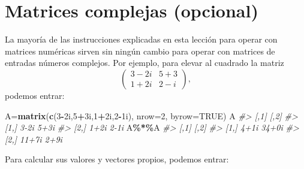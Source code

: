 \documentclass[
]{book}
\newenvironment{Shaded}{\begin{snugshade}}{\end{snugshade}}
\newcommand{\CommentTok}[1]{\textcolor[rgb]{0.56,0.35,0.01}{\textit{#1}}}
\newcommand{\DataTypeTok}[1]{\textcolor[rgb]{0.13,0.29,0.53}{#1}}
\newcommand{\DecValTok}[1]{\textcolor[rgb]{0.00,0.00,0.81}{#1}}
\newcommand{\KeywordTok}[1]{\textcolor[rgb]{0.13,0.29,0.53}{\textbf{#1}}}
\newcommand{\NormalTok}[1]{#1}
\newcommand{\OperatorTok}[1]{\textcolor[rgb]{0.81,0.36,0.00}{\textbf{#1}}}
\newcommand{\OtherTok}[1]{\textcolor[rgb]{0.56,0.35,0.01}{#1}}
\theoremstyle{definition}
\theoremstyle{definition}
\theoremstyle{definition}
\theoremstyle{remark}
\begin{document}
\hypertarget{matrices-complejas-opcional}{%
\section{Matrices complejas (opcional)}\label{matrices-complejas-opcional}}

La mayoría de las instrucciones explicadas en esta lección para operar con matrices numéricas sirven sin ningún cambio para operar con matrices de entradas números complejos. Por ejemplo, para elevar al cuadrado la matriz
\[
\left( \begin{array}{cc} 3-2i & 5+3\\ 1+2i & 2-i \end{array}
\right),
\]
podemos entrar:

\begin{Shaded}
\begin{Highlighting}[]
\NormalTok{A=}\KeywordTok{matrix}\NormalTok{(}\KeywordTok{c}\NormalTok{(}\DecValTok{3}\OperatorTok{{-}}\NormalTok{2i,}\DecValTok{5}\OperatorTok{+}\NormalTok{3i,}\DecValTok{1}\OperatorTok{+}\NormalTok{2i,}\DecValTok{2}\OperatorTok{{-}}\NormalTok{1i), }\DataTypeTok{nrow=}\DecValTok{2}\NormalTok{, }\DataTypeTok{byrow=}\OtherTok{TRUE}\NormalTok{)}
\NormalTok{A}
\CommentTok{\#\textgreater{}      [,1] [,2]}
\CommentTok{\#\textgreater{} [1,] 3{-}2i 5+3i}
\CommentTok{\#\textgreater{} [2,] 1+2i 2{-}1i}
\NormalTok{A}\OperatorTok{\%*\%}\NormalTok{A}
\CommentTok{\#\textgreater{}       [,1]  [,2]}
\CommentTok{\#\textgreater{} [1,]  4+1i 34+0i}
\CommentTok{\#\textgreater{} [2,] 11+7i  2+9i}
\end{Highlighting}
\end{Shaded}

Para calcular sus valores y vectores propios, podemos entrar:

\begin{Shaded}
\end{Shaded}
\end{document}
